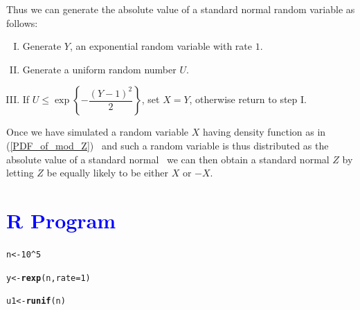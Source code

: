 \documentclass[11pt, a4paper]{article}\usepackage[]{graphicx}\usepackage[]{xcolor}
\makeatletter
\newcommand{\hlnum}[1]{\textcolor[rgb]{0.686,0.059,0.569}{#1}}%
\newcommand{\hlopt}[1]{\textcolor[rgb]{0,0,0}{#1}}%
\newcommand{\hldef}[1]{\textcolor[rgb]{0.345,0.345,0.345}{#1}}%
\newcommand{\hlkwb}[1]{\textcolor[rgb]{0.69,0.353,0.396}{#1}}%
\newcommand{\hlkwc}[1]{\textcolor[rgb]{0.333,0.667,0.333}{#1}}%
\newcommand{\hlkwd}[1]{\textcolor[rgb]{0.737,0.353,0.396}{\textbf{#1}}}%
\newenvironment{kframe}{%
 \def\at@end@of@kframe{}%
 \ifinner\ifhmode%
  \def\at@end@of@kframe{\end{minipage}}%
  \begin{minipage}{\columnwidth}%
 \fi\fi%
 \def\FrameCommand##1{\hskip\@totalleftmargin \hskip-\fboxsep
 \colorbox{shadecolor}{##1}\hskip-\fboxsep
     \hskip-\linewidth \hskip-\@totalleftmargin \hskip\columnwidth}%
 \MakeFramed {\advance\hsize-\width
   \@totalleftmargin\z@ \linewidth\hsize
   \@setminipage}}%
 {\par\unskip\endMakeFramed%
 \at@end@of@kframe}
\newenvironment{knitrout}{}{} %
\makeatother
\begin{document}
\newpage

Thus we can generate the absolute value of a standard normal random variable as follows:

\begin{enumerate}[I.]
\item Generate $Y$, an exponential random variable with rate $1$.
\item Generate a uniform random number $U$.
\item If $U \leq \exp \! \left\{ - \dfrac{(Y-1)^2}{2} \right\}$, set $X = Y$, otherwise return to step I.
\end{enumerate}

Once we have simulated a random variable $X$ having density function as in (\ref{PDF_of_mod_Z}) \textemdash\ and such a random variable is thus distributed as the absolute value of a standard normal \textemdash\ we can then obtain a standard normal $Z$ by letting $Z$ be equally likely to be either $X$ or $-X$.

\section*{\faArrowAltCircleRight[regular] \textcolor{blue}{R Program}}



\begin{knitrout}
\color{fgcolor}\begin{kframe}
\begin{alltt}
\hldef{n} \hlkwb{<-} \hlnum{10}\hlopt{^}\hlnum{5}
\end{alltt}
\end{kframe}
\end{knitrout}

\begin{knitrout}
\color{fgcolor}\begin{kframe}
\begin{alltt}
\hldef{y} \hlkwb{<-} \hlkwd{rexp}\hldef{(n,} \hlkwc{rate} \hldef{=} \hlnum{1}\hldef{)}
\end{alltt}
\end{kframe}
\end{knitrout}

\begin{knitrout}
\color{fgcolor}\begin{kframe}
\begin{alltt}
\hldef{u1} \hlkwb{<-} \hlkwd{runif}\hldef{(n)}
\end{alltt}
\end{kframe}
\end{knitrout}
\end{document}
